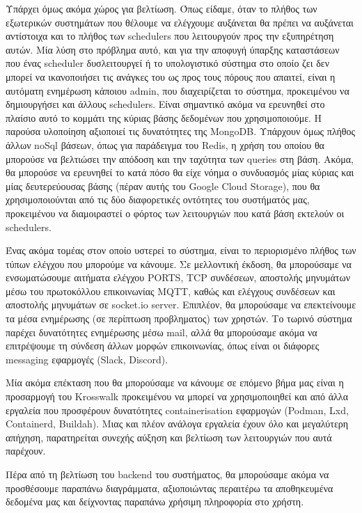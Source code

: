 Υπάρχει όμως ακόμα χώρος για βελτίωση. Όπως είδαμε, όταν το πλήθος των εξωτερικών συστημάτων που θέλουμε να ελέγχουμε
αυξάνεται θα πρέπει να αυξάνεται αντίστοιχα και το πλήθος των schedulers που λειτουργούν προς την εξυπηρέτηση αυτών. Μία λύση στο πρόβλημα αυτό, και για
την αποφυγή ύπαρξης καταστάσεων που ένας scheduler δυσλειτουργεί ή το υπολογιστικό σύστημα στο οποίο ζει δεν μπορεί να ικανοποιήσει
τις ανάγκες του ως προς τους πόρους που απαιτεί, είναι η αυτόματη ενημέρωση κάποιου admin, που διαχειρίζεται το σύστημα,
προκειμένου να δημιουργήσει και άλλους schedulers. Είναι σημαντικό ακόμα να ερευνηθεί στο πλαίσιο αυτό το κομμάτι της κύριας βάσης δεδομένων
που χρησιμοποιούμε. H παρούσα υλοποίηση αξιοποιεί τις δυνατότητες της MongoDB. Υπάρχουν όμως πλήθος άλλων
noSql βάσεων, όπως για παράδειγμα του Redis, η χρήση του οποίου θα μπορούσε να βελτιώσει την απόδοση και την ταχύτητα των
queries στη βάση. Ακόμα, θα μπορούσε να ερευνηθεί το κατά πόσο θα είχε νόημα ο συνδυασμός μίας κύριας και μίας δευτερεύουσας βάσης (πέραν αυτής του Google Cloud Storage),
που θα χρησιμοποιούνται από τις δύο διαφορετικές οντότητες του συστήματός μας, προκειμένου να διαμοιραστεί ο φόρτος των λειτουργιών που κατά βάση εκτελούν οι schedulers.

Ένας ακόμα τομέας στον οποίο υστερεί το σύστημα, είναι το περιορισμένο πλήθος των τύπων ελέγχου που μπορούμε
να κάνουμε. Σε μελλοντική έκδοση, θα μπορούσαμε να ενσωματώσουμε αιτήματα ελέγχου PORTS, TCP συνδέσεων, αποστολής μηνυμάτων μέσω του πρωτοκόλλου επικοινωνίας MQTT,
καθώς και ελέγχους συνδέσεων και αποστολής μηνυμάτων σε socket.io server. Επιπλέον, θα μπορούσαμε να επεκτείνουμε τα 
μέσα ενημέρωσης (σε περίπτωση προβληματος) των χρηστών. Το τωρινό σύστημα παρέχει δυνατότητες ενημέρωσης μέσω mail, αλλά θα μπορούσαμε ακόμα να επιτρέψουμε
τη σύνδεση άλλων μορφών επικοινωνίας, όπως είναι οι διάφορες messaging εφαρμογές (Slack, Discord). 

Μία ακόμα επέκταση που θα μπορούσαμε να κάνουμε σε επόμενο βήμα μας είναι η προσαρμογή του Krosswalk προκειμένου να μπορεί να χρησιμοποιηθεί και από άλλα
εργαλεία που προσφέρουν δυνατότητες containerisation εφαρμογών (Podman, Lxd, Containerd, Buildah). Μιας και πλέον ανάλογα εργαλεία έχουν όλο και μεγαλύτερη απήχηση, παρατηρείται συνεχής αύξηση και
βελτίωση των λειτουργιών που αυτά παρέχουν.

Πέρα από τη βελτίωση του backend του συστήματος, θα μπορούσαμε ακόμα να προσθέσουμε παραπάνω διαγράμματα,
αξιοποιώντας περαιτέρω τα αποθηκευμένα δεδομένα μας και δείχνοντας παραπάνω χρήσιμη πληροφορία στο χρήστη.